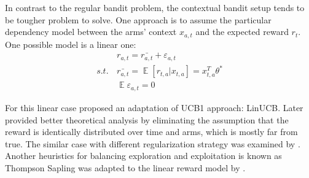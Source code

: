 \documentclass[a4paper]{article}
\DeclareMathOperator{\E}{\mathop{\mathbb{E}}}
\begin{document}
In contrast to the regular bandit problem, the contextual bandit setup tends to be tougher problem to solve. One approach is to assume the particular dependency model between the arms' context $x_{a,t}$ and the expected reward $r_t$. One possible model is a linear one: \begin{align}
        &\label{eq:reward_linear_assumption}
        r_{a,t} = \bar{r_{a,t}} + \varepsilon_{a,t} \\
        s.t.\, & \bar{r_{a,t}}  = \E[r_{t,a}|x_{t,a}] = x_{t,a}^T\theta^* \\
        & \E \varepsilon_{a,t}  = 0 
    \end{align}
    
    For this linear case \cite{Li2010} proposed an adaptation of UCB1 approach: LinUCB. Later \cite{Abbasi-Yadkori2011} provided better theoretical analysis by eliminating the assumption that the reward is identically distributed over time and arms, which is mostly far from true. The similar case with different regularization strategy was examined by \cite{Auer2003}. Another heuristics for balancing exploration and exploitation is known as Thompson Sapling was adapted to the linear reward model by \cite{Agrawal2013}. 


\end{document}
